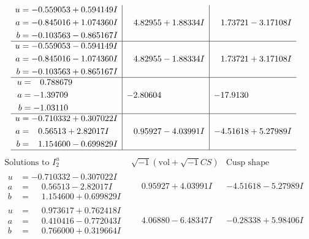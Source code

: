 \documentclass[1p]{elsarticle_modified}
\theoremstyle{definition}
\newcommand{\I}{\sqrt{-1}}
\begin{document}
$$\begin{array}{c|c|c}
\begin{aligned}
u &= -0.559053 + 0.594149 I \\
a &= -0.845016 + 1.074360 I \\
b &= -0.103563 - 0.865167 I\end{aligned}
 & \phantom{-}4.82955 + 1.88334 I & \phantom{-}1.73721 - 3.17108 I \\ \hline\begin{aligned}
u &= -0.559053 - 0.594149 I \\
a &= -0.845016 - 1.074360 I \\
b &= -0.103563 + 0.865167 I\end{aligned}
 & \phantom{-}4.82955 - 1.88334 I & \phantom{-}1.73721 + 3.17108 I \\ \hline\begin{aligned}
u &= \phantom{-}0.788679\phantom{ +0.000000I} \\
a &= -1.39709\phantom{ +0.000000I} \\
b &= -1.03110\phantom{ +0.000000I}\end{aligned}
 & -2.80604\phantom{ +0.000000I} & -17.9130\phantom{ +0.000000I} \\ \hline\begin{aligned}
u &= -0.710332 + 0.307022 I \\
a &= \phantom{-}0.56513 + 2.82017 I \\
b &= \phantom{-}1.154600 - 0.699829 I\end{aligned}
 & \phantom{-}0.95927 - 4.03991 I & -4.51618 + 5.27989 I\\
 \hline 
 \end{array}$$\newpage$$\begin{array}{c|c|c}  
\text{Solutions to }I^u_{2}& \I (\text{vol} + \sqrt{-1}CS) & \text{Cusp shape}\\
 \hline 
\begin{aligned}
u &= -0.710332 - 0.307022 I \\
a &= \phantom{-}0.56513 - 2.82017 I \\
b &= \phantom{-}1.154600 + 0.699829 I\end{aligned}
 & \phantom{-}0.95927 + 4.03991 I & -4.51618 - 5.27989 I \\ \hline\begin{aligned}
u &= \phantom{-}0.973617 + 0.762418 I \\
a &= \phantom{-}0.410416 - 0.772043 I \\
b &= \phantom{-}0.766000 + 0.319664 I\end{aligned}
 & \phantom{-}4.06880 - 6.48347 I & -0.28338 + 5.98406 I \\ \hline\begin{aligned}

\end{aligned}
\end{array}$$
\end{document}
